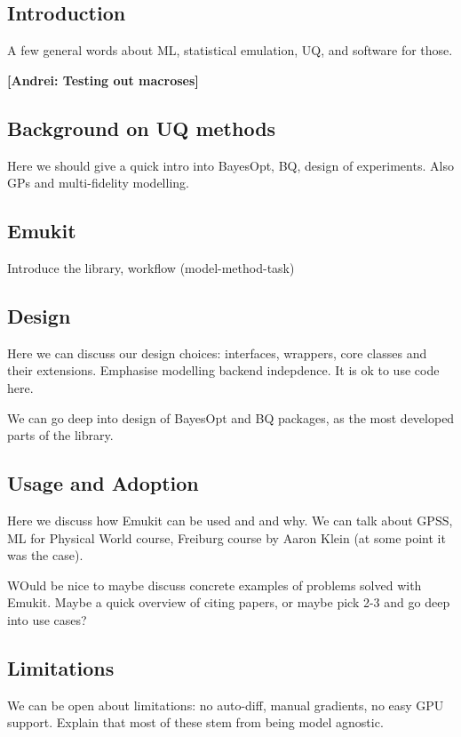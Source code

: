 
\newcommand{\maren}[1]{{\color{blue} \textbf{[Maren: #1]}}}
\newcommand{\andrei}[1]{{\color{red} \textbf{[Andrei: #1]}}}

\subsection{Introduction \label{introduction}}
A few general words about ML, statistical emulation, UQ, and software for those.

\andrei{Testing out macroses}

\subsection{Background on UQ methods}
Here we should give a quick intro into BayesOpt, BQ, design of experiments. Also GPs and multi-fidelity modelling.

\subsection{Emukit}
Introduce the library, workflow (model-method-task)

\subsection{Design}
Here we can discuss our design choices: interfaces, wrappers, core classes and their extensions. Emphasise modelling backend indepdence. It is ok to use code here.

We can go deep into design of BayesOpt and BQ packages, as the most developed parts of the library.

\subsection{Usage and Adoption}
Here we discuss how Emukit can be used and and why. We can talk about GPSS, ML for Physical World course, Freiburg course by Aaron Klein (at some point it was the case).

WOuld be nice to maybe discuss concrete examples of problems solved with Emukit. Maybe a quick overview of citing papers, or maybe pick 2-3 and go deep into use cases?

\subsection{Limitations}
We can be open about limitations: no auto-diff, manual gradients, no easy GPU support. Explain that most of these stem from being model agnostic.

